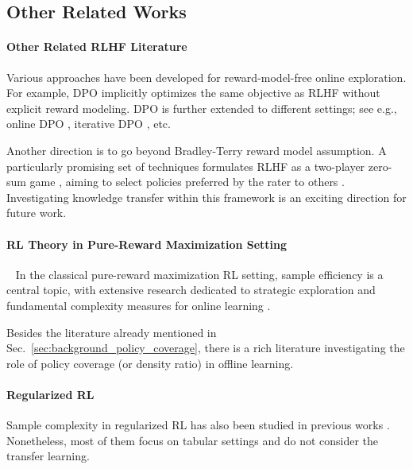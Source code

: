 \subsection{Other Related Works}\label{appx:related_workds}

\paragraph{Other Related RLHF Literature}
%
Various approaches have been developed for reward-model-free online exploration. For example, DPO \citep{rafailov2024direct} implicitly optimizes the same objective as RLHF without explicit reward modeling. DPO is further extended to different settings; see e.g., online DPO \citep{guo2024direct}, iterative DPO \citep{xu2023some, pang2024iterative, dong2405rlhf}, etc.

%

Another direction is to go beyond Bradley-Terry reward model assumption. A particularly promising set of techniques formulates RLHF as a two-player zero-sum game \citep{yue2012k}, aiming to select policies preferred by the rater to others \citep{rosset2024direct, ye2024theoretical, munos2023nash, swamy2024minimaximalist}.
Investigating knowledge transfer within this framework is an exciting direction for future work.

\paragraph{RL Theory in Pure-Reward Maximization Setting}~
In the classical pure-reward maximization RL setting, sample efficiency is a central topic, with extensive research dedicated to strategic exploration and fundamental complexity measures for online learning \citep{russo2013eluder, jiang2017contextual, jin2021bellman, foster2021statistical, du2021bilinear}.

Besides the literature already mentioned in Sec.~\ref{sec:background_policy_coverage}, there is a rich literature \citep{uehara2020minimax,jiang2020minimax,jin2021pessimism,xie2021bellman} investigating the role of policy coverage (or density ratio) in offline learning.

\paragraph{Regularized RL}
Sample complexity in regularized RL has also been studied in previous works \citep{ziebart2008maximum,ziebart2010modeling,geist2019theory,tiapkin2023fast}.
Nonetheless, most of them focus on tabular settings and do not consider the transfer learning.



%
%
%
%
%


%
%
%


%
%